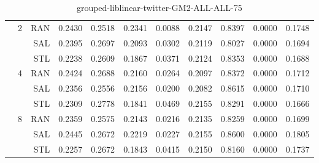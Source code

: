 \begin{center}
\begin{table}[htbp]
\begin{center}
\begin{tabular}{ | r | r | r | r | r | r | r | r | r | r | r |}
 & \multirow{3}{*}{2} & RAN & 0.2430 & 0.2518 & 0.2341 & 0.0088 & 0.2147 & 0.8397 & 0.0000 & 0.1748\\ \cline{3-11}
 &   & SAL & 0.2395 & 0.2697 & 0.2093 & 0.0302 & 0.2119 & 0.8027 & 0.0000 & 0.1694\\ \cline{3-11}
 &   & STL & 0.2238 & 0.2609 & 0.1867 & 0.0371 & 0.2124 & 0.8353 & 0.0000 & 0.1688\\ \cline{2-11}
 & \multirow{3}{*}{4} & RAN & 0.2424 & 0.2688 & 0.2160 & 0.0264 & 0.2097 & 0.8372 & 0.0000 & 0.1712\\ \cline{3-11}
 &   & SAL & 0.2356 & 0.2556 & 0.2156 & 0.0200 & 0.2082 & 0.8615 & 0.0000 & 0.1710\\ \cline{3-11}
 &   & STL & 0.2309 & 0.2778 & 0.1841 & 0.0469 & 0.2155 & 0.8291 & 0.0000 & 0.1666\\ \cline{2-11}
 & \multirow{3}{*}{8} & RAN & 0.2359 & 0.2575 & 0.2143 & 0.0216 & 0.2135 & 0.8259 & 0.0000 & 0.1699\\ \cline{3-11}
 &   & SAL & 0.2445 & 0.2672 & 0.2219 & 0.0227 & 0.2155 & 0.8600 & 0.0000 & 0.1805\\ \cline{3-11}
 &   & STL & 0.2257 & 0.2672 & 0.1843 & 0.0415 & 0.2150 & 0.8160 & 0.0000 & 0.1737\\ \cline{2-11}
\hline
\end{tabular}
\caption{grouped-liblinear-twitter-GM2-ALL-ALL-75}
\end{center}
 \end{table}
\end{center}

